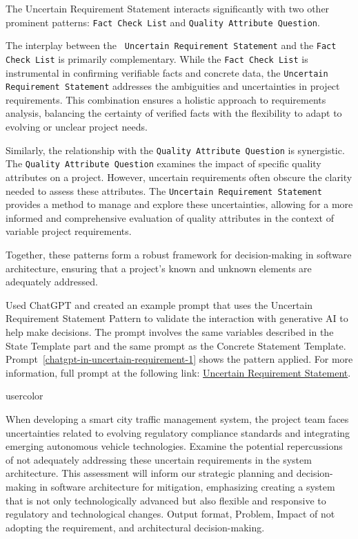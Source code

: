The Uncertain Requirement Statement interacts significantly with two other prominent patterns: \texttt{Fact Check List} and \texttt{Quality Attribute Question}.

The interplay between the \texttt{ Uncertain Requirement Statement} and the \texttt{Fact Check List} is primarily complementary. While the \texttt{Fact  Check List} is instrumental in confirming verifiable facts and concrete data, the \texttt{Uncertain Requirement Statement} addresses the ambiguities and uncertainties in project requirements. This combination ensures a holistic approach to requirements analysis, balancing the certainty of verified facts with the flexibility to adapt to evolving or unclear project needs.

Similarly, the relationship with the \texttt{Quality Attribute Question} is synergistic. The \texttt{Quality Attribute Question} examines the impact of specific quality attributes on a project. However, uncertain requirements often obscure the clarity needed to assess these attributes. The \texttt{Uncertain Requirement Statement} provides a method to manage and explore these uncertainties, allowing for a more informed and comprehensive evaluation of quality attributes in the context of variable project requirements.

Together, these patterns form a robust framework for decision-making in software architecture, ensuring that a project's known and unknown elements are adequately addressed.

 Used ChatGPT and created an example prompt that uses the Uncertain Requirement Statement Pattern to validate the interaction with generative AI to help make decisions. The prompt involves the same variables described in the State Template part and the same prompt as the Concrete Statement Template. Prompt~\ref{chatgpt-in-uncertain-requirement-1} shows the pattern applied. For more information, full prompt at the following link: \href{https://chat.openai.com/share/4155325e-0d73-4e69-816a-b38df4588660}{Uncertain Requirement Statement}.

\begin{chatin}{usercolor}{}

When developing a smart city traffic management system, the project team faces uncertainties related to evolving regulatory compliance standards and integrating emerging autonomous vehicle technologies. Examine the potential repercussions of not adequately addressing these uncertain requirements in the system architecture. This assessment will inform our strategic planning and decision-making in software architecture for mitigation, emphasizing creating a system that is not only technologically advanced but also flexible and responsive to regulatory and technological changes. Output format, Problem, Impact of not adopting the requirement, and architectural decision-making.
\end{chatin}


